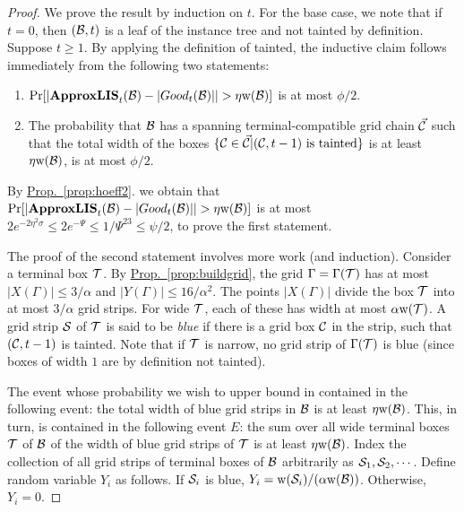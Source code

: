 \documentclass{acmsmall}
\newcommand{\cB}{{\cal B}}
\newcommand{\cC}{{\cal C}}
\newcommand{\cS}{{\cal S}}
\newcommand{\cT}{{\cal T}}
\newcommand{\Prop}[1]{\hyperref[prop:#1]{Prop.~\ref*{prop:#1}}} %
\newcommand{\Clm}[1]{\hyperref[clm:#1]{Claim~\ref*{clm:#1}}} %
\newcommand{\taint}{\eta}
\newcommand{\taintprob}{\phi}
\newcommand{\pr}{{\rm Pr}}
\newcommand{\width}{{\bf {\rm  w}}}
\newcommand{\gridprec}{\alpha}
\newcommand{\errorcont}{\Psi}
\newcommand{\ssz}{\sigma}
\newcommand{\approxlis}{{\rm {\bf ApproxLIS}}}
\begin{document}
\begin{proof}
We prove the result by induction on  $t$.
 For the base case, we note that
if $t=0$, then $(\cB,t)$ is a leaf of the instance tree and not tainted by definition.
Suppose $t\geq 1$.
By applying the definition of tainted, the inductive claim follows immediately from
the following two statements:

\begin{enumerate}
\item 
 $\pr[|\approxlis_t(\cB) - |Good_t(\cB)|| > \taint \width(\cB)]$  is at most $\taintprob/2$.
\item   
The probability that $\cB$ has a spanning terminal-compatible grid chain $\vec{\cC}$  such that the
total width of the boxes $\{\cC \in \vec{\cC}| \textrm{$(\cC,t-1)$ is tainted}\}$ is at least $\taint \width(\cB)$, is at most
$\taintprob/2$.
%
\end{enumerate}

By \Prop{hoeff2}. we obtain that
$\pr[|\approxlis_t(\cB)-|Good_t(\cB)|| > \taint \width(\cB)]$ is at most $2e^{-2\taint^2 \ssz} \leq 2e^{-\errorcont} \leq 1/\errorcont^{23} \leq \psi/2$, to prove the first statement.


The proof of the second statement involves more work (and  induction).
Consider a terminal box $\cT$.  By \Prop{buildgrid}, the 
grid $\Gamma=\Gamma(\cT)$ has at most $|X(\Gamma)| \leq 3/\gridprec$ and $|Y(\Gamma)| \leq 16/\gridprec^2$. The points
$|X(\Gamma)|$ divide the box  $\cT$ into at most $3/\gridprec$ grid strips. For wide $\cT$, each of these has width at most $\gridprec \width(\cT)$.
A grid strip $\cS$ of $\cT$ is said to be \emph{blue}
if there is a grid box $\cC$ in the strip, such that $(\cC,t-1)$ is tainted. 
Note that if $\cT$ is narrow, no grid strip of $\Gamma(\cT)$ is blue (since boxes of width $1$ are by definition
not tainted).  

The event whose probability we wish to upper bound in contained in the following event: the total width of blue grid strips
in $\cB$ is at least $\taint\width(\cB)$. This, in turn, is contained in the following event $E$:
the sum over all wide terminal boxes $\cT$ of $\cB$ of the width of blue grid strips of $\cT$ is at least $\taint\width(\cB)$.
Index the collection of all grid strips of terminal boxes of $\cB$
arbitrarily as $\cS_1, \cS_2, \cdots$. Define random variable $Y_i$ as follows.
If $\cS_i$ is blue, $Y_i = \width(\cS_i)/(\gridprec \width(\cB))$. Otherwise, $Y_i = 0$.


\end{proof}
\end{document}
